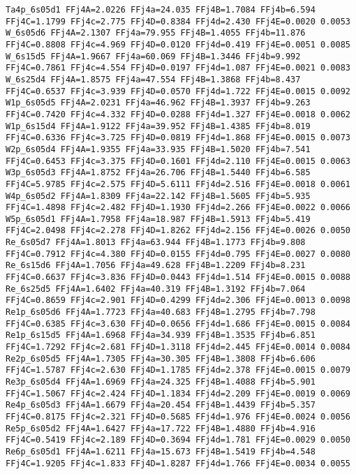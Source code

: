 {\begin{verbatim}
Ta4p_6s05d1 FFj4A=2.0226 FFj4a=24.035 FFj4B=1.7084 FFj4b=6.594 FFj4C=1.1799 FFj4c=2.775 FFj4D=0.8384 FFj4d=2.430 FFj4E=0.0020 0.0053 
W_6s05d6 FFj4A=2.1307 FFj4a=79.955 FFj4B=1.4055 FFj4b=11.876 FFj4C=0.8808 FFj4c=4.969 FFj4D=0.0120 FFj4d=0.419 FFj4E=0.0051 0.0085 
W_6s15d5 FFj4A=1.9667 FFj4a=60.069 FFj4B=1.3446 FFj4b=9.992 FFj4C=0.7861 FFj4c=4.554 FFj4D=0.0197 FFj4d=1.087 FFj4E=0.0021 0.0083 
W_6s25d4 FFj4A=1.8575 FFj4a=47.554 FFj4B=1.3868 FFj4b=8.437 FFj4C=0.6537 FFj4c=3.939 FFj4D=0.0570 FFj4d=1.722 FFj4E=0.0015 0.0092 
W1p_6s05d5 FFj4A=2.0231 FFj4a=46.962 FFj4B=1.3937 FFj4b=9.263 FFj4C=0.7420 FFj4c=4.332 FFj4D=0.0288 FFj4d=1.327 FFj4E=0.0018 0.0062 
W1p_6s15d4 FFj4A=1.9122 FFj4a=39.952 FFj4B=1.4385 FFj4b=8.019 FFj4C=0.6336 FFj4c=3.725 FFj4D=0.0819 FFj4d=1.868 FFj4E=0.0015 0.0073 
W2p_6s05d4 FFj4A=1.9355 FFj4a=33.935 FFj4B=1.5020 FFj4b=7.541 FFj4C=0.6453 FFj4c=3.375 FFj4D=0.1601 FFj4d=2.110 FFj4E=0.0015 0.0063 
W3p_6s05d3 FFj4A=1.8752 FFj4a=26.706 FFj4B=1.5440 FFj4b=6.585 FFj4C=5.9785 FFj4c=2.575 FFj4D=5.6111 FFj4d=2.516 FFj4E=0.0018 0.0061 
W4p_6s05d2 FFj4A=1.8309 FFj4a=22.142 FFj4B=1.5605 FFj4b=5.935 FFj4C=1.4898 FFj4c=2.482 FFj4D=1.1930 FFj4d=2.266 FFj4E=0.0022 0.0066 
W5p_6s05d1 FFj4A=1.7958 FFj4a=18.987 FFj4B=1.5913 FFj4b=5.419 FFj4C=2.0498 FFj4c=2.278 FFj4D=1.8262 FFj4d=2.156 FFj4E=0.0026 0.0050 
Re_6s05d7 FFj4A=1.8013 FFj4a=63.944 FFj4B=1.1773 FFj4b=9.808 FFj4C=0.7912 FFj4c=4.380 FFj4D=0.0155 FFj4d=0.795 FFj4E=0.0027 0.0080 
Re_6s15d6 FFj4A=1.7056 FFj4a=49.628 FFj4B=1.2209 FFj4b=8.231 FFj4C=0.6637 FFj4c=3.836 FFj4D=0.0443 FFj4d=1.514 FFj4E=0.0015 0.0088 
Re_6s25d5 FFj4A=1.6402 FFj4a=40.319 FFj4B=1.3192 FFj4b=7.064 FFj4C=0.8659 FFj4c=2.901 FFj4D=0.4299 FFj4d=2.306 FFj4E=0.0013 0.0098 
Re1p_6s05d6 FFj4A=1.7723 FFj4a=40.683 FFj4B=1.2795 FFj4b=7.798 FFj4C=0.6385 FFj4c=3.630 FFj4D=0.0656 FFj4d=1.686 FFj4E=0.0015 0.0084 
Re1p_6s15d5 FFj4A=1.6968 FFj4a=34.939 FFj4B=1.3535 FFj4b=6.851 FFj4C=1.7292 FFj4c=2.681 FFj4D=1.3118 FFj4d=2.445 FFj4E=0.0014 0.0084 
Re2p_6s05d5 FFj4A=1.7305 FFj4a=30.305 FFj4B=1.3808 FFj4b=6.606 FFj4C=1.5787 FFj4c=2.630 FFj4D=1.1785 FFj4d=2.378 FFj4E=0.0015 0.0079 
Re3p_6s05d4 FFj4A=1.6969 FFj4a=24.325 FFj4B=1.4088 FFj4b=5.901 FFj4C=1.5067 FFj4c=2.424 FFj4D=1.1834 FFj4d=2.209 FFj4E=0.0019 0.0069 
Re4p_6s05d3 FFj4A=1.6679 FFj4a=20.454 FFj4B=1.4439 FFj4b=5.357 FFj4C=0.8175 FFj4c=2.321 FFj4D=0.5685 FFj4d=1.976 FFj4E=0.0024 0.0056 
Re5p_6s05d2 FFj4A=1.6427 FFj4a=17.722 FFj4B=1.4880 FFj4b=4.916 FFj4C=0.5419 FFj4c=2.189 FFj4D=0.3694 FFj4d=1.781 FFj4E=0.0029 0.0050 
Re6p_6s05d1 FFj4A=1.6211 FFj4a=15.673 FFj4B=1.5419 FFj4b=4.548 FFj4C=1.9205 FFj4c=1.833 FFj4D=1.8287 FFj4d=1.766 FFj4E=0.0034 0.0055 

\end{verbatim}}
